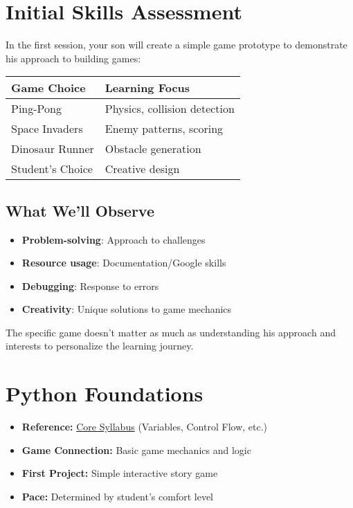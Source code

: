 \documentclass{article}
\begin{document}
\section{Initial Skills Assessment}
In the first session, your son will create a simple game prototype to demonstrate his approach to building games:

\begin{center}
\begin{tabular}{|l|l|}
\hline
\textbf{Game Choice} & \textbf{Learning Focus} \\
\hline
Ping-Pong & Physics, collision detection \\
\hline
Space Invaders & Enemy patterns, scoring \\
\hline
Dinosaur Runner & Obstacle generation \\
\hline
Student's Choice & Creative design \\
\hline
\end{tabular}
\end{center}

\subsection*{What We'll Observe}
\begin{itemize}
\item \textbf{Problem-solving}: Approach to challenges
\item \textbf{Resource usage}: Documentation/Google skills
\item \textbf{Debugging}: Response to errors
\item \textbf{Creativity}: Unique solutions to game mechanics
\end{itemize}

The specific game doesn't matter as much as understanding his approach and interests to personalize the learning journey.

\section{Python Foundations}
\begin{itemize}[nosep]
    \item \textbf{Reference:} \href{https://codeabode.co/Syllabus.pdf}{Core Syllabus} (Variables, Control Flow, etc.)
    \item \textbf{Game Connection:} Basic game mechanics and logic
    \item \textbf{First Project:} Simple interactive story game
    \item \textbf{Pace:} Determined by student's comfort level
\end{itemize}
\end{document}

